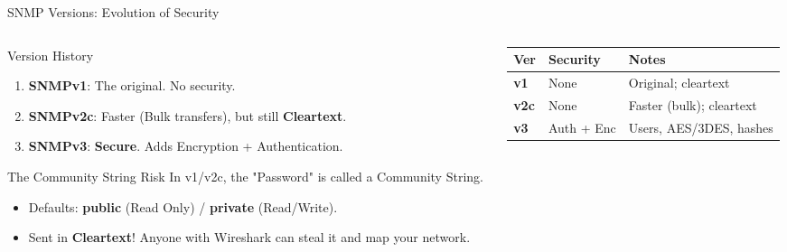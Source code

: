 \documentclass[aspectratio=169]{beamer}  %
\begin{document}
\begin{frame}{SNMP Versions: Evolution of Security}
    \begin{columns}[T]
        \begin{column}{0.55\textwidth}
            \begin{block}{Version History}
                \footnotesize
                \begin{enumerate}
                    \item \textbf{SNMPv1}: The original. No security.
                    \item \textbf{SNMPv2c}: Faster (Bulk transfers), but still \textbf{Cleartext}.
                    \item \textbf{SNMPv3}: \textbf{Secure}. Adds Encryption + Authentication.
                \end{enumerate}
            \end{block}
            \begin{alertblock}{The Community String Risk}
                \footnotesize
                In v1/v2c, the "Password" is called a Community String.
                \begin{itemize}
                    \item Defaults: \textbf{public} (Read Only) / \textbf{private} (Read/Write).
                    \item Sent in \textbf{Cleartext}! Anyone with Wireshark can steal it and map your network.
                \end{itemize}
            \end{alertblock}
        \end{column}
        \begin{column}{0.42\textwidth}
            \begin{center}
                \footnotesize
                \setlength{\tabcolsep}{3pt}
                \renewcommand{\arraystretch}{1.1}
                \begin{tabular}{>{\bfseries}p{1.2cm} p{2.1cm} p{2.3cm}}
                    \toprule
                    Ver & Security & Notes \\
                    \midrule
                    v1 & None & Original; cleartext \\
                    v2c & None & Faster (bulk); cleartext \\
                    v3 & Auth + Enc & Users, AES/3DES, hashes \\
                    \bottomrule
                \end{tabular}
            \end{center}
        \end{column}
    \end{columns}
\end{frame}
\end{document}
